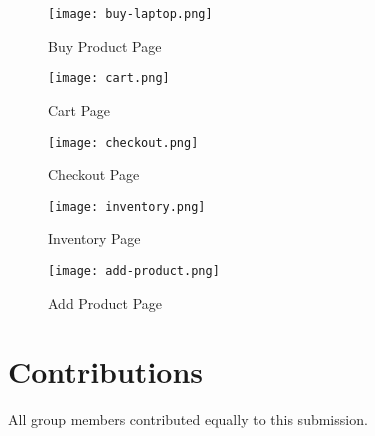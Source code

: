 \documentclass[12pt]{article}
\begin{document}
\begin{figure}
    \centering
    \texttt{[image: buy-laptop.png]}
    \caption{Buy Product Page}
    \label{fig:buylaptop}
\end{figure}

\begin{figure}
    \centering
    \texttt{[image: cart.png]}
    \caption{Cart Page}
    \label{fig:cart}
\end{figure}

\begin{figure}
    \centering
    \texttt{[image: checkout.png]}
    \caption{Checkout Page}
    \label{fig:checkout}
\end{figure}



\begin{figure}
    \centering
    \texttt{[image: inventory.png]}
    \caption{Inventory Page}
    \label{fig:inventory}
\end{figure}


\begin{figure}
    \centering
    \texttt{[image: add-product.png]}
    \caption{Add Product Page}
    \label{fig:addproduct}
\end{figure}



\section*{Contributions}
All group members contributed equally to this submission.
\end{document}
